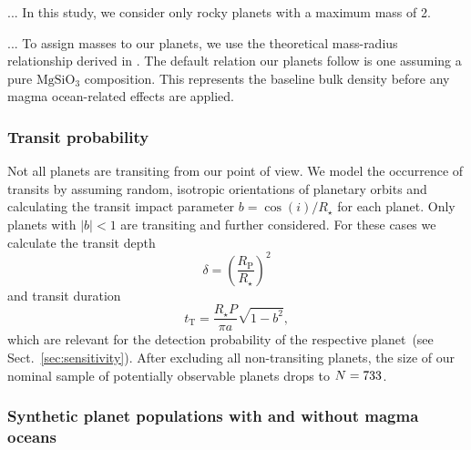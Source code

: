 \documentclass[modern]{aastex631}
\begin{document}
\begin{note}
    ...
    In this study, we consider only rocky planets with a maximum mass of \SI{2}{\Mearth}. %

    ...
    To assign masses to our planets, we use the theoretical mass-radius relationship derived in \citet{Zeng2016}.
    The default relation our planets follow is one assuming a pure $\mathrm{MgSiO_3}$ composition. 
    This represents the baseline bulk density before any magma ocean-related effects are applied.
\end{note}


\subsubsection{Transit probability}
\begin{note}
    Not all planets are transiting from our point of view.
    We model the occurrence of transits by assuming random, isotropic orientations of planetary orbits and calculating the transit impact parameter $b = \cos(i)/R_\star$ for each planet.
    Only planets with $|b| < 1$ are transiting and further considered.
    For these cases we calculate the transit depth
    \begin{equation}\label{eq:transitdepth}
        \delta = \left( \frac{R_\mathrm{P}}{R_\star} \right)^2
    \end{equation}
    and transit duration
    \begin{equation}\label{eq:transitduration}
        t_{\mathrm{T}} = \frac{R_\star P}{\pi a} \sqrt{1 - b^2},
    \end{equation}
    which are relevant for the detection probability of the respective planet~(see Sect.~\ref{sec:sensitivity}).
    After excluding all non-transiting planets, the size of our nominal sample of potentially observable planets drops to $N = 733$.
\end{note}




\subsubsection{Synthetic planet populations with and without magma oceans}
\begin{note}

\end{note}
\end{document}

